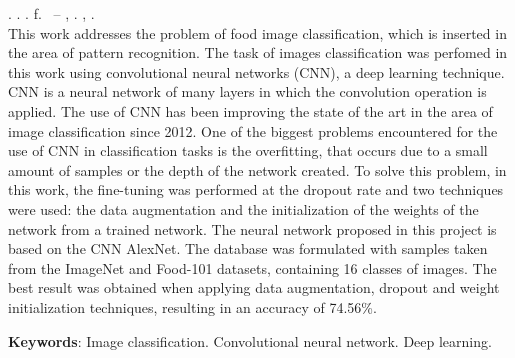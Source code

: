 
\begin{resumo}[ABSTRACT]
\begin{SingleSpacing}

\imprimirautorcitacao. \imprimirtitleabstract. \imprimirdata. \pageref {LastPage} f. \imprimirprojeto\ – \imprimirprograma, \imprimirinstituicao. \imprimirlocal, \imprimirdata.\\


This work addresses the problem of food image classification, which is inserted in the area of pattern recognition. The task of images classification was perfomed in this work using convolutional neural networks (CNN), a deep learning technique. CNN is a neural network of many layers in which the convolution operation is applied. The use of CNN has been improving the state of the art in the area of image classification since 2012. One of the biggest problems encountered for the use of CNN in classification tasks is the overfitting, that occurs due to a small amount of samples or the depth of the network created. To solve this problem, in this work, the fine-tuning was performed at the dropout rate and two techniques were used: the data augmentation and the initialization of the weights of the network from a trained network. The neural network proposed in this project is based on the CNN AlexNet. The database was formulated with samples taken from the ImageNet and Food-101 datasets, containing 16 classes of images. The best result was obtained when applying data augmentation, dropout and weight initialization techniques, resulting in an accuracy of 74.56\%.

\textbf{Keywords}: Image classification. Convolutional neural network. Deep learning.

\end{SingleSpacing}
\end{resumo}

